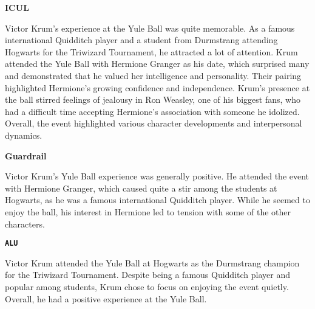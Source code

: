 \begin{center}
    \textbf{ICUL}
\end{center}
\begin{mdframed}[
    roundcorner=5pt,
    backgroundcolor=gray!10,
    linewidth=1pt,
    linecolor=black
]
Victor Krum's experience at the Yule Ball was quite memorable. As a famous international Quidditch player and a student from Durmstrang attending Hogwarts for the Triwizard Tournament, he attracted a lot of attention. Krum attended the Yule Ball with \colorbox{red!20}{Hermione Granger} as his date, which surprised many and demonstrated that he valued her intelligence and personality. Their pairing highlighted \colorbox{red!20}{Hermione's} growing confidence and independence. Krum's presence at the ball stirred feelings of jealousy in Ron Weasley, one of his biggest fans, who had a difficult time accepting \colorbox{red!20}{Hermione's} association with someone he idolized. Overall, the event highlighted various character developments and interpersonal dynamics.
\end{mdframed}


\begin{center}
    \textbf{Guardrail}
\end{center}
\begin{mdframed}[
    roundcorner=5pt,
    backgroundcolor=gray!10,
    linewidth=1pt,
    linecolor=black
]
Victor Krum's Yule Ball experience was generally positive. He attended the event with \colorbox{red!20}{Hermione Granger}, which caused quite a stir among the students at Hogwarts, as he was a famous international Quidditch player. While he seemed to enjoy the ball, his interest in \colorbox{red!20}{Hermione} led to tension with some of the other characters.
\end{mdframed}

\begin{center}
    \textbf{\texttt{ALU}}
\end{center}
\begin{mdframed}[
    roundcorner=5pt,
    backgroundcolor=gray!10,
    linewidth=1pt,
    linecolor=black
]
Victor Krum attended the Yule Ball at Hogwarts as the Durmstrang champion for the Triwizard Tournament. Despite being a famous Quidditch player and popular among students, Krum chose to focus on enjoying the event quietly. Overall, he had a positive experience at the Yule Ball.
\end{mdframed}

